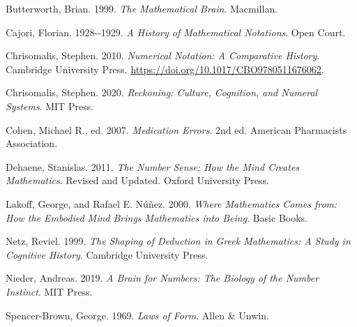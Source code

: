 \documentclass[
]{article}
\newlength{\cslhangindent}
\newenvironment{CSLReferences}[2] %
 {\begin{list}{}{%
  \setlength{\itemindent}{0pt}
  \setlength{\leftmargin}{0pt}
  \setlength{\parsep}{0pt}
  \ifodd #1
   \setlength{\leftmargin}{\cslhangindent}
   \setlength{\itemindent}{-1\cslhangindent}
  \fi
  \setlength{\itemsep}{#2\baselineskip}}}
 {\end{list}}
\begin{document}
\protect{}\label{refs}
\begin{CSLReferences}{1}{1}
Butterworth, Brian. 1999. \emph{The Mathematical Brain}. Macmillan.

Cajori, Florian. 1928-\/-1929. \emph{A History of Mathematical
Notations}. Open Court.

Chrisomalis, Stephen. 2010. \emph{Numerical Notation: A Comparative
History}. Cambridge University Press.
\url{https://doi.org/10.1017/CBO9780511676062}.

Chrisomalis, Stephen. 2020. \emph{Reckoning: Culture, Cognition, and
Numeral Systems}. MIT Press.

Cohen, Michael R., ed. 2007. \emph{Medication Errors}. 2nd ed. American
Pharmacists Association.

Dehaene, Stanislas. 2011. \emph{The Number Sense: How the Mind Creates
Mathematics}. Revised and Updated. Oxford University Press.

Lakoff, George, and Rafael E. Núñez. 2000. \emph{Where Mathematics Comes
from: How the Embodied Mind Brings Mathematics into Being}. Basic Books.

Netz, Reviel. 1999. \emph{The Shaping of Deduction in Greek Mathematics:
A Study in Cognitive History}. Cambridge University Press.

Nieder, Andreas. 2019. \emph{A Brain for Numbers: The Biology of the
Number Instinct}. MIT Press.

Spencer-Brown, George. 1969. \emph{Laws of Form}. Allen \& Unwin.

\end{CSLReferences}
\end{document}
